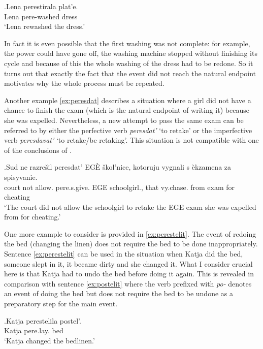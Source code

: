 \exg.\label{ex:perestirat}Lena perestirala plat'e.\\
Lena pere-washed dress\\
\trans `Lena rewashed the dress.'

In fact it is even possible that the first washing was not complete: for example, the power could have gone off, the washing machine stopped without finishing its cycle and because of this the whole washing of the dress had to be redone. So it turns out that exactly the fact that the event did not reach the natural endpoint motivates why the whole process must be repeated.

Another example \ref{ex:peresdat} describes a situation where a girl did not have a chance to finish the exam (which is the natural endpoint of writing it) because she was expelled. Nevertheless, a new attempt to pass the same exam can be referred to by either the perfective verb \textit{peresdat'} `to retake' or the imperfective verb \textit{peresdavat'} `to retake/be retaking'. This situation is not compatible with one of the conclusions of \citet{Kagan:book}.

\exg.\label{ex:peresdat}Sud ne razre\v{s}il peresdat' EG\`{E} \v{s}kol'nice, kotoruju vygnali s \`{e}kzamena za spisyvanie.\\
court not allow. pere.s.give. EGE schoolgirl., that vy.chase. from exam for cheating\\
\trans `The court did not allow the schoolgirl to retake the EGE exam she was expelled from for cheating.'

One more example to consider is provided in \ref{ex:perestelit}. The event of redoing the bed (changing the linen) does not require the bed to be done inappropriately. Sentence \ref{ex:perestelit} can be used in the situation when Katja did the bed, someone slept in it, it became dirty and she changed it. What I consider crucial here is that Katja had to undo the bed before doing it again. This is revealed in comparison with sentence \ref{ex:postelit} where the verb prefixed with \textit{po-} denotes an event of doing the bed but does not require the bed to be undone as a preparatory step for the main event. 

\exg.\label{ex:perestelit}Katja perestelila postel'.\\
Katja pere.lay. bed\\
\trans `Katja changed the bedlinen.'

